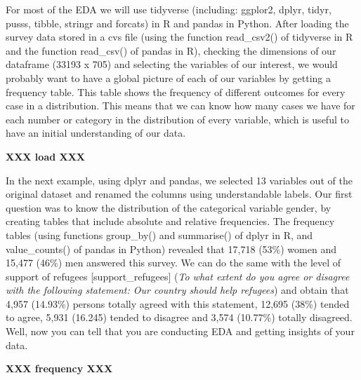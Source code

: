 For most of the EDA we will use tidyverse (including: ggplor2, dplyr, tidyr, pusss, tibble, stringr and forcats) in R and pandas in Python. After loading the survey data stored in a cvs file (using the function read\_csv2() of tidyverse in R and the function read\_csv() of pandas in R), checking the dimensions of our dataframe (33193 x 705) and selecting the variables of our interest, we would probably want to have a global picture of each of our variables by getting a frequency table. This table shows the frequency of different outcomes for every case in a distribution. This means that we can know how many cases we have for each number or category in the distribution of every variable, which is useful to have an initial understanding of our data.

\textbf{XXX  load  XXX}
		

In the next example, using dplyr and pandas, we selected 13 variables out of the original dataset and renamed the columns using understandable labels. Our first question was to know the distribution of the categorical variable gender, by creating tables that include absolute and relative frequencies. The frequency tables (using functions group\_by() and summarise() of dplyr in R, and value\_counts() of pandas in Python) revealed that 17,718 (53\%) women and 15,477 (46\%) men answered this survey. We can do the same with the level of support of refugees [support\_refugees] (\textit{To what extent do you agree or disagree with the following statement: Our country should help refugees}) and obtain that 4,957 (14.93\%) persons totally agreed with this statement, 12,695 (38\%) tended to agree, 5,931 (16.245) tended to disagree and 3,574 (10.77\%) totally disagreed. Well, now you can tell that you are conducting EDA and getting insights of your data.

\textbf{XXX  frequency  XXX}

